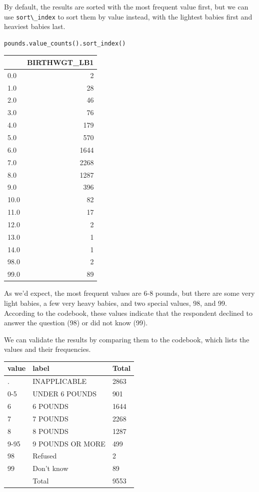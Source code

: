By default, the results are sorted with the most frequent value first,
but we can use \passthrough{\lstinline!sort\_index!} to sort them by
value instead, with the lightest babies first and heaviest babies last.

\begin{lstlisting}[language=Python,style=source]
pounds.value_counts().sort_index()
\end{lstlisting}

\begin{tabular}{lr}
\toprule
{} &  BIRTHWGT\_LB1 \\
\midrule
0.0  &             2 \\
1.0  &            28 \\
2.0  &            46 \\
3.0  &            76 \\
4.0  &           179 \\
5.0  &           570 \\
6.0  &          1644 \\
7.0  &          2268 \\
8.0  &          1287 \\
9.0  &           396 \\
10.0 &            82 \\
11.0 &            17 \\
12.0 &             2 \\
13.0 &             1 \\
14.0 &             1 \\
98.0 &             2 \\
99.0 &            89 \\
\bottomrule
\end{tabular}

As we'd expect, the most frequent values are 6-8 pounds, but there are
some very light babies, a few very heavy babies, and two special values,
98, and 99. According to the codebook, these values indicate that the
respondent declined to answer the question (98) or did not know (99).

We can validate the results by comparing them to the codebook, which
lists the values and their frequencies.

\begin{longtable}[]{@{}lll@{}}
\toprule
value & label & Total\tabularnewline
\midrule
\endhead
. & INAPPLICABLE & 2863\tabularnewline
0-5 & UNDER 6 POUNDS & 901\tabularnewline
6 & 6 POUNDS & 1644\tabularnewline
7 & 7 POUNDS & 2268\tabularnewline
8 & 8 POUNDS & 1287\tabularnewline
9-95 & 9 POUNDS OR MORE & 499\tabularnewline
98 & Refused & 2\tabularnewline
99 & Don't know & 89\tabularnewline
& Total & 9553\tabularnewline
\bottomrule
\end{longtable}

